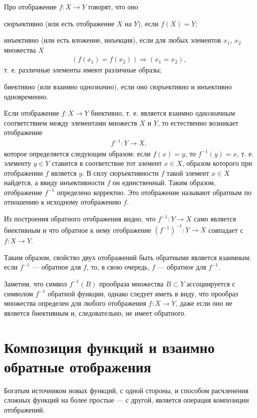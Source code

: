 \documentclass[14pt]{extreport}
\begin{document}
Про отображение $f\colon X \to Y$ говорят, что оно

сюръективно (или есть отображение $X$ на $Y$), если $f(X)=Y$;

инъективно (или есть вложение, инъекция), если для любых элементов $x_1$, $x_2$ множества $X$
\begin{eqnarray}
(f(x_1)=f(x_2)) \Rightarrow (x_1=x_2),
\end{eqnarray}
т. е. различные элементы имеют различные образы;

биективно (или взаимно однозначно), если оно сюръективно и инъективно одновременно.

Если отображение $f\colon X \to Y$ биективно, т. е. является взаимно однозначным соответствием между элементами множеств $X$ и $Y$, то естественно возникает отображение
\begin{eqnarray}
f^{-1}\colon Y \to X,
\end{eqnarray}
которое определяется следующим образом: если $f(x)=y$, то $f^{-1}(y)=x$, т. е.
элементу $y \in Y$ ставится в соответствие тот элемент $x \in X$, образом которого при отображении $f$ является $y$. В силу сюръективности $f$ такой элемент
$x \in X$ найдется, а ввиду инъективности $f$ он единственный. Таким образом,
отображение $f^{-1}$ определено корректно. Это отображение называют обратным по отношению к исходному отображению $f$.

Из построения обратного отображения видно, что $f^{-1}\colon Y \to X$ само является биективным и что обратное к нему отображение $(f^{-1})^{-1}\colon Y \to X$ совпадает с $f\colon X \to Y$.

Таким образом, свойство двух отображений быть обратными является
взаимным: если $f^{-1}$ — обратное для $f$, то, в свою очередь, $f$ — обратное
для $f^{-1}$.

Заметим, что символ $f^{-1}(B)$ прообраза множества $B \subset Y$ ассоциируется с
символом $f^{-1}$ обратной функции, однако следует иметь в виду, что прообраз
множества определен для любого отображения $f\colon X \to Y$, даже если оно не
является биективным и, следовательно, не имеет обратного.

\section{Композиция функций и взаимно обратные отображения}
Богатым источником новых функций, с одной стороны, и способом расчленения сложных функций на более простые — с другой, является операция композиции
отображений.
\end{document}
